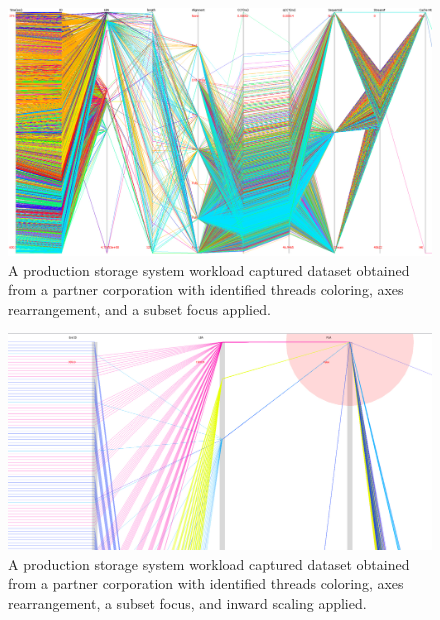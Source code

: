 \documentclass[12pt]{ucthesis}
\begin{document}
\begin{figure}[h!]
 \centering
 \includegraphics[width=\textwidth]{images/3.jpg}
 \caption[Focus on a production workload with threads colored.]{A production storage system workload captured dataset obtained from a partner corporation with identified threads coloring, axes rearrangement, and a subset focus applied.}
\end{figure}

\begin{figure}[h!]
 \centering
 \includegraphics[width=\textwidth]{images/4.jpg}
 \caption[Focus applied on a production workload with threads colored.]{A production storage system workload captured dataset obtained from a partner corporation with identified threads coloring, axes rearrangement, a subset focus, and inward scaling applied.}
\end{figure}
\end{document}
